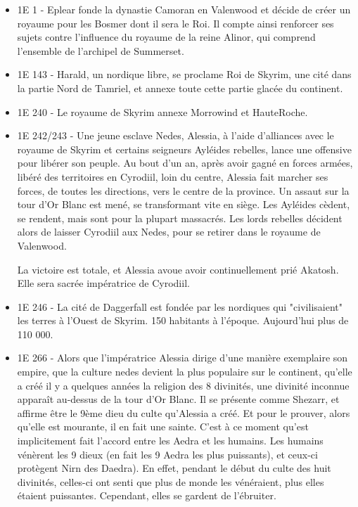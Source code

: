 \begin{itemize}
\setlength{\leftmargin}{35pt}
\setlength{\itemsep}{20pt}
\item
1E 1 - Eplear fonde la dynastie Camoran en Valenwood et décide de créer un royaume pour les Bosmer dont il sera le Roi. Il compte ainsi renforcer ses sujets contre l'influence du royaume de la reine Alinor, qui comprend l'ensemble de l'archipel de Summerset.
\item
1E 143 - Harald, un nordique libre, se proclame Roi de Skyrim, une cité dans la partie Nord de Tamriel, et annexe toute cette partie glacée du continent.
\item
1E 240 - Le royaume de Skyrim annexe Morrowind et HauteRoche.
\item
1E 242/243 - Une jeune esclave Nedes, Alessia, à l'aide d'alliances avec le royaume de Skyrim et certains seigneurs Ayléides rebelles, lance une offensive pour libérer son peuple. Au bout d'un an, après avoir gagné en forces armées, libéré des territoires en Cyrodiil, loin du centre, Alessia fait marcher ses forces, de toutes les directions, vers le centre de la province. Un assaut sur la tour d'Or Blanc est mené, se transformant vite en siège. Les Ayléides cèdent, se rendent, mais sont pour la plupart massacrés. Les lords rebelles décident alors de laisser Cyrodiil aux Nedes, pour se retirer dans le royaume de Valenwood.

La victoire est totale, et Alessia avoue avoir continuellement prié Akatosh. Elle sera sacrée impératrice de Cyrodiil.
\item
1E 246 - La cité de Daggerfall est fondée par les nordiques qui "civilisaient" les terres à l'Ouest de Skyrim. 150 habitants à l'époque. Aujourd'hui plus de 110 000.

\item
1E 266 - Alors que l'impératrice Alessia dirige d'une manière exemplaire son empire, que la culture nedes devient la plus populaire sur le continent, qu'elle a créé il y a quelques années la religion des 8 divinités, une divinité inconnue apparaît au-dessus de la tour d'Or Blanc. Il se présente comme Shezarr, et affirme être le 9ème dieu du culte qu'Alessia a créé. Et pour le prouver, alors qu'elle est mourante, il en fait une sainte. C'est à ce moment qu'est implicitement fait l'accord entre les Aedra et les humains. Les humains vénèrent les 9 dieux (en fait les 9 Aedra les plus puissants), et ceux-ci protègent Nirn des Daedra). En effet, pendant le début du culte des huit divinités, celles-ci ont senti que plus de monde les vénéraient, plus elles étaient puissantes. Cependant, elles se gardent de l'ébruiter.


\end{itemize}
